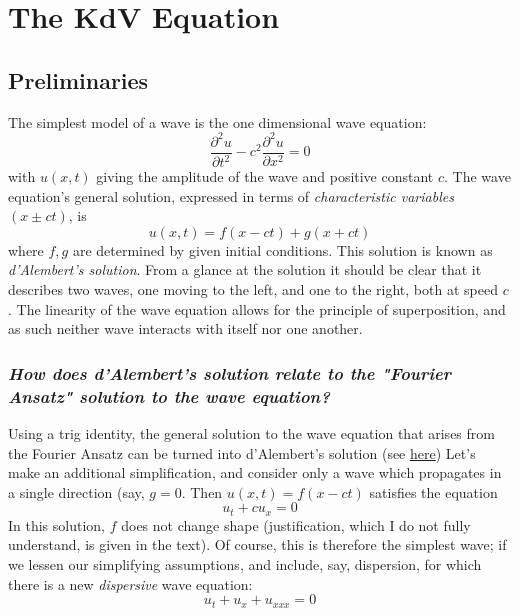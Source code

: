 \documentclass[12pt]{article}
\begin{document}
\section{The KdV Equation}

\subsection{Preliminaries}
The simplest model of a wave is the one dimensional wave equation:
\begin{equation}
\frac{\partial^2 u}{\partial t^2} - c^2 \frac{\partial^2 u}{\partial x^2} = 0
\end{equation}
with $u(x, t)$ giving the amplitude of the wave and positive constant $c$.
The wave equation's general solution, expressed in terms of \textit{characteristic variables} $(x \pm ct)$, is
\begin{equation}
	u(x, t) = f(x - ct) + g(x + ct)
\end{equation}
where $f, g$ are determined by given initial conditions. This solution is known as \textit{d'Alembert's solution}. From a glance at the solution it should be clear that it describes two waves, one moving to the left, and one to the right, both at speed $c$. The linearity of the wave equation allows for the principle of superposition, and as such neither wave interacts with itself nor one another. 
\subsubsection {\textit{How does d'Alembert's solution relate to the "Fourier Ansatz" solution to the wave equation?}}
Using a trig identity, the general solution to the wave equation that arises from the Fourier Ansatz can be turned into d'Alembert's solution (see \href{https://math.libretexts.org/Bookshelves/Differential_Equations/Differential_Equations_(Chasnov)/09%3A_Partial_Differential_Equations/9.06%3A_Solution_of_the_Wave_Equation}{here}) 
Let's make an additional simplification, and consider only a wave which propagates in a single direction (say, $g = 0$. Then $u(x, t) = f(x - ct)$ satisfies the equation
\begin{equation}
	u_{t} + cu_{x} = 0
\end{equation}
In this solution, $f$ does not change shape (justification, which I do not fully understand, is given in the text). Of course, this is therefore the simplest wave; if we lessen our simplifying assumptions, and include, say, dispersion, for which there is a new \textit{dispersive} wave equation:
\begin{equation}
	u_t + u_x + u_{xxx} = 0
\end{equation}
\end{document}
